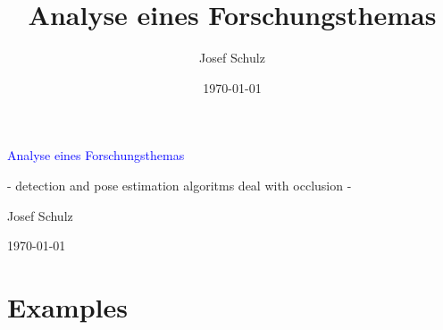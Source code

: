 \documentclass[xcolor=dvipsnames]{beamer}
\title{Analyse eines Forschungsthemas}
\author{Josef Schulz}
\date{\today}
\begin{document}

\begin{frame}
	\begin{center}
		\Large
		\textcolor{blue}{Analyse eines Forschungsthemas}
		
		\normalsize
		\vspace{0.2cm}
		- detection and pose estimation algoritms deal with occlusion -
		
		\vspace{1cm}
		Josef Schulz
		
		\vspace{1cm}
		\today
	\end{center}
\end{frame}

\section{Examples}
\end{document}
